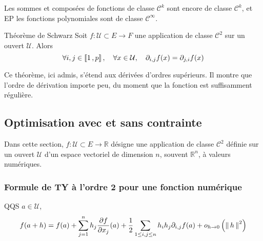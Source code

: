     Les sommes et composées de fonctions de classe $\mathcal{C}^k$ sont encore de classe $\mathcal{C}^k$, et EP les fonctions polynomiales sont de classe $\mathcal{C}^{\infty}$. 

    \begin{theo}{Théorème de Schwarz}{}
        Soit $f : \mathcal{U} \subset E \to F$ une application de classe $\mathcal{C}^2$ sur un ouvert $\mathcal{U}$. Alors 
        \[ \forall i,j \in \left\llbracket 1 \, , p \right\rrbracket, \quad \forall x \in \mathcal{U}, \quad \partial_{i,j} f(x) = \partial_{j,i} f (x) \]   
    \end{theo}

    Ce théorème, ici admis, s’étend aux dérivées d’ordres supérieurs. Il montre que l’ordre de dérivation importe peu, du moment que la fonction est suffisamment régulière. 

\subsection{Optimisation avec et sans contrainte}

    Dans cette section, $f : \mathcal{U} \subset E \to \mathbb{R}$ désigne une application de classe $\mathcal{C}^2$ définie sur un ouvert $\mathcal{U}$ d’un espace vectoriel de dimension $n$, souvent $\mathbb{R}^n$, à valeurs numériques.

    \subsubsection{Formule de TY à l’ordre 2 pour une fonction numérique}

    \begin{theo}{}{}
        QQS $a \in \mathcal{U}$, 
        \[ f(a+h) = f(a) + \sum_{j=1}^{n} h_j \frac{\partial f}{\partial x_j}(a) + \frac{1}{2} \sum_{1 \leq i,j \leq n} h_i h_j \partial_{i,j}f(a) + o_{h \rightarrow 0} \left(\left\lVert\,h\,\right\rVert^2\right) \]    
    \end{theo}

